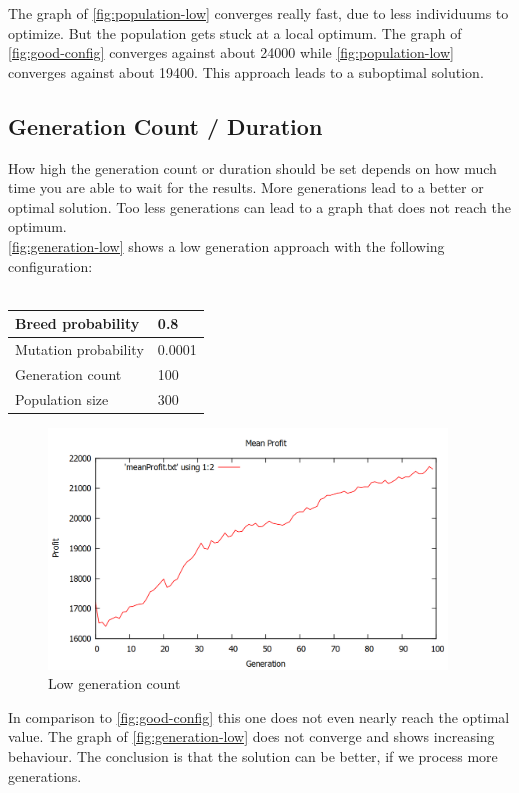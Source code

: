 \documentclass[fontsize=12pt,toc=bibliography, notitlepage]{scrreprt}
\begin{document}
The graph of \autoref{fig:population-low} converges really fast, due to less individuums to optimize. But the population gets stuck at a local optimum. The graph of \autoref{fig:good-config} converges against about 24000 while \autoref{fig:population-low} converges against about 19400. This approach leads to a suboptimal solution.

\subsection{Generation Count / Duration}
\label{subsec:algorithm-duration}
How high the generation count or duration should be set depends on how much time you are able to wait for the results. More generations lead to a better or optimal solution. Too less generations can lead to a graph that does not reach the optimum. \\
\autoref{fig:generation-low} shows a low generation approach with the following configuration: \\ \\
\begin{tabular}{ |l|l| }
	\hline
	Breed probability & 0.8 \\ \hline
	Mutation probability & 0.0001 \\ \hline
	Generation count & 100 \\ \hline
	Population size & 300 \\ \hline
\end{tabular}
\begin{figure}[H]
	\centering
	\includegraphics[width=400px]{images/generation-low.png}
	\caption{Low generation count}
	\label{fig:generation-low}
\end{figure}
In comparison to \autoref{fig:good-config} this one does not even nearly reach the optimal value. The graph of \autoref{fig:generation-low} does not converge and shows increasing behaviour. The conclusion is that the solution can be better, if we process more generations.
\end{document}
